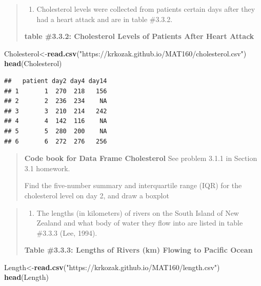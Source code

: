 \documentclass[]{book}
\newenvironment{Shaded}{\begin{snugshade}}{\end{snugshade}}
\newcommand{\KeywordTok}[1]{\textcolor[rgb]{0.13,0.29,0.53}{\textbf{#1}}}
\newcommand{\NormalTok}[1]{#1}
\newcommand{\StringTok}[1]{\textcolor[rgb]{0.31,0.60,0.02}{#1}}
\providecommand{\tightlist}{%
  \setlength{\itemsep}{0pt}\setlength{\parskip}{0pt}}
\begin{document}
\begin{quote}
\begin{enumerate}
\def\labelenumi{\arabic{enumi}.}
\setcounter{enumi}{4}
\tightlist
\item
  Cholesterol levels were collected from patients certain days after they had a heart attack and are in table \#3.3.2.
\end{enumerate}

\textbf{table \#3.3.2: Cholesterol Levels of Patients After Heart Attack}
\end{quote}

\begin{Shaded}
\begin{Highlighting}[]
\NormalTok{Cholesterol<-}\KeywordTok{read.csv}\NormalTok{(}\StringTok{"https://krkozak.github.io/MAT160/cholesterol.csv"}\NormalTok{)}
\KeywordTok{head}\NormalTok{(Cholesterol)}
\end{Highlighting}
\end{Shaded}

\begin{verbatim}
##   patient day2 day4 day14
## 1       1  270  218   156
## 2       2  236  234    NA
## 3       3  210  214   242
## 4       4  142  116    NA
## 5       5  280  200    NA
## 6       6  272  276   256
\end{verbatim}

\begin{quote}
\textbf{Code book for Data Frame Cholesterol} See problem 3.1.1 in Section 3.1 homework.

Find the five-number summary and interquartile range (IQR) for the cholesterol level on day 2, and draw a boxplot
\end{quote}

\begin{quote}
\begin{enumerate}
\def\labelenumi{\arabic{enumi}.}
\setcounter{enumi}{5}
\tightlist
\item
  The lengths (in kilometers) of rivers on the South Island of New Zealand and what body of water they flow into are listed in table \#3.3.3 (Lee, 1994).
\end{enumerate}

\textbf{Table \#3.3.3: Lengths of Rivers (km) Flowing to Pacific Ocean}
\end{quote}

\begin{Shaded}
\begin{Highlighting}[]
\NormalTok{Length<-}\KeywordTok{read.csv}\NormalTok{(}\StringTok{"https://krkozak.github.io/MAT160/length.csv"}\NormalTok{)}
\KeywordTok{head}\NormalTok{(Length)}
\end{Highlighting}
\end{Shaded}
\end{document}
